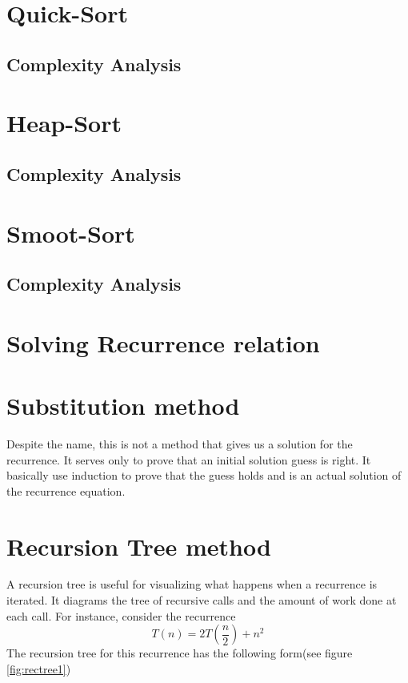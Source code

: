 \section{Quick-Sort}

\subsection{Complexity Analysis}

\section{Heap-Sort}

\subsection{Complexity Analysis}

\section{Smoot-Sort}

\subsection{Complexity Analysis}


\section{Solving Recurrence relation}

\section{Substitution method}
\label{sec:substitutionmethod}
Despite the name, this is not a method that gives us a solution for the recurrence. It serves only to prove that an initial solution guess is right. It basically use induction to prove that the guess holds and is an actual solution of the recurrence equation.


\section{Recursion Tree method}
A recursion tree is useful for visualizing what happens when a recurrence is iterated. It diagrams the tree of recursive calls and the amount of work done at each call.
For instance, consider the recurrence
\[T(n) = 2T(\frac{n}{2}) + n^2\]
The recursion tree for this recurrence has the following form(see figure \ref{fig:rectree1})

